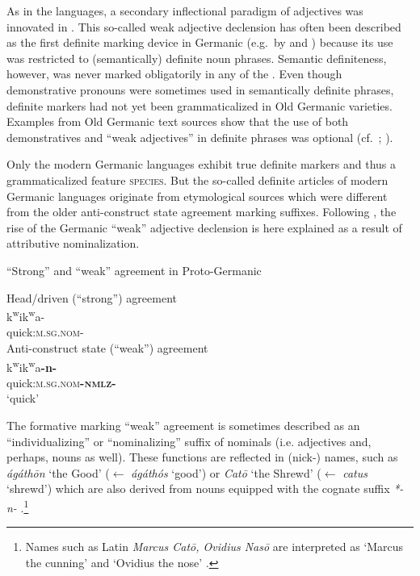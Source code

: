 As in the  languages, a secondary inflectional paradigm of adjectives was innovated in . This so-called weak adjective declension has often been described as the first definite marking device in Germanic (e.g.~by \citealt{heinrichs1954} and \citealt[170]{ringe2006}) because its use was restricted to (semantically) definite noun phrases. Semantic definiteness, however, was never marked obligatorily in any of the . Even though demonstrative pronouns were sometimes used in semantically definite phrases, definite markers had not yet been grammaticalized in Old Germanic varieties. Examples from Old Germanic text sources show that the use of both demonstratives and “weak adjectives” in definite phrases was optional (cf.~\citealt{philippi1997}; \citealt{heinrichs1954}).

Only the modern Germanic languages exhibit true definite markers and thus a grammaticalized feature \textsc{species}. But the so-called definite articles of modern Germanic languages originate from etymological sources which were different from the older anti-construct state agreement marking suffixes. Following \citet[267–268]{riesler2006a}, the rise of the Germanic “weak” adjective declension is here explained as a result of attributive nominalization. 
\begin{exe}
\ex \rm{“Strong” and “weak” agreement in Proto\hyp{}Germanic \citep[169]{ringe2006}}
\begin{xlist}
\ex \rm{Head\slash{}driven (“strong”) agreement}\\
\gll *k\textsuperscript{w}ik\textsuperscript{w}a-\\
	quick:\textsc{m.sg.nom-}\\
\ex \rm{Anti-construct state (“weak”) agreement}\\
\gll *k\textsuperscript{w}ik\textsuperscript{w}a\textbf{-n-}\\
	quick:\textsc{m.sg.nom}\textbf{\textsc{-nmlz-}}\\
\glt	‘quick’
\end{xlist}
\end{exe}
The  formative marking “weak” agreement is sometimes described as an “individualizing” or “nominalizing” suffix of nominals (i.e. adjectives and, perhaps, nouns as well). These functions are reflected in (nick-) names, such as  \textit{ágáthōn} ‘the Good’ ($\leftarrow$ \textit{ágáthós} ‘good’) or  \textit{Catō} ‘the Shrewd’ ($\leftarrow$ \textit{catus} ‘shrewd’) which are also derived from nouns equipped with the cognate suffix \textit{*-n-} \citep[170]{ringe2006}.\footnote{Names such as Latin \textit{Marcus Catō, Ovidius Nasō} are interpreted as ‘Marcus the cunning’ and ‘Ovidius the nose’ \citep[6–7]{nocentini1996}.}

